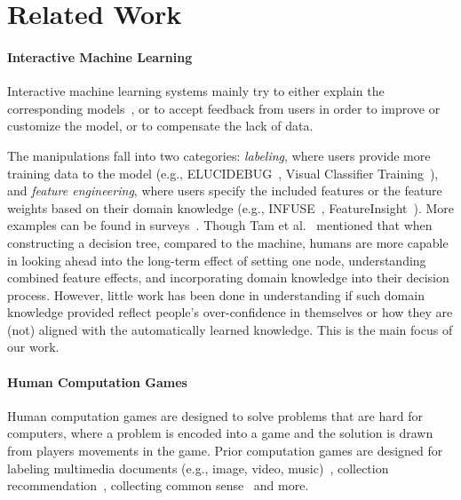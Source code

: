 
\section{Related Work}


\paragraph{Interactive Machine Learning}
Interactive machine learning systems mainly try to either explain the corresponding models~\cite{ren2017squares, alsallakh2014visual}, or to accept feedback from users in order to improve or customize the model, or to compensate the lack of data.

The manipulations fall into two categories: 
\emph{labeling}, where users provide more training data to the model (e.g., ELUCIDEBUG~\cite{kulesza2015principles}, Visual Classifier Training~\cite{heimerl2012visual}), and \emph{feature engineering}, where users specify the included features or the feature weights based on their domain knowledge (e.g., INFUSE~\cite{krause2014infuse}, FeatureInsight~\cite{brooks2015featureinsight}).
More examples can be found in surveys~\cite{Brown2016HumanMachineLearnerIT}. 
Though Tam et al.~\cite{tam2017analysis} mentioned that when constructing a decision tree, compared to the machine, humans are more capable in looking ahead into the long-term effect of setting one node, understanding combined feature effects, and incorporating domain knowledge into their decision process.
However, little work has been done in understanding if such domain knowledge provided reflect people's over-confidence in themselves or how they are (not) aligned with the automatically learned knowledge. 
This is the main focus of our work.

\paragraph{Human Computation Games}

Human computation games are designed to solve problems that are hard for computers, where a problem is encoded into a game and the solution is drawn from players movements in the game. Prior computation games are designed for labeling multimedia documents (e.g., image, video, music)~\cite{vonAhn:2004:LIC:985692.985733,ho2009kisskissban,vonAhn:2006:PGL:1124772.1124782,Seneviratne:2010:IFI:1743384.1743473,law2007tagatune}, collection recommendation~\cite{walsh2010curator}, collecting common sense~\cite{von2006verbosity} and more. 

